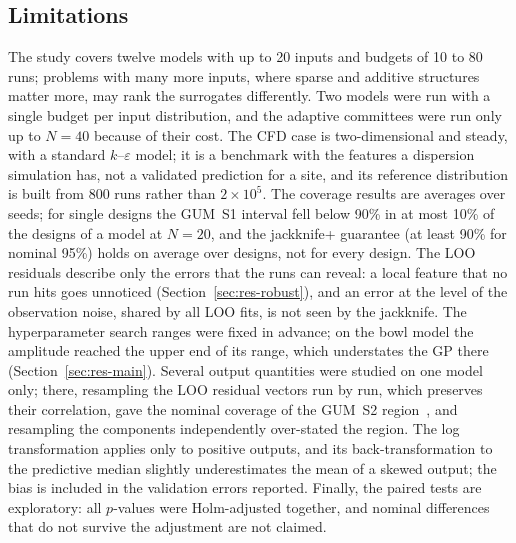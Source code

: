 \subsection{Limitations}
The study covers twelve models with up to 20 inputs and budgets of 10 to
80 runs; problems with many more inputs, where sparse and additive
structures matter more, may rank the surrogates differently. Two models were run with
a single budget per input distribution, and the adaptive committees were
run only up to $N=40$ because of their cost. The CFD case is
two-dimensional and steady, with a standard $k$--$\varepsilon$ model; it is a
benchmark with the features a dispersion simulation has, not a validated
prediction for a site, and its reference distribution is built from 800
runs rather than $2\times10^5$. The coverage results are averages over
seeds; for single designs the GUM~S1 interval fell below 90\% in at most
10\% of the designs of a model at $N=20$, and the jackknife+ guarantee (at
least 90\% for nominal 95\%) holds on average over designs, not for every
design. The LOO residuals describe only the errors that the runs can
reveal: a local feature that no run hits goes unnoticed
(Section~\ref{sec:res-robust}), and an error at the level of the
observation noise, shared by all LOO fits, is not seen by the jackknife.
The hyperparameter search ranges were fixed in advance; on the bowl
model the amplitude reached the upper end of its range, which understates
the GP there (Section~\ref{sec:res-main}). Several output quantities were
studied on one model only; there, resampling the LOO residual vectors run
by run, which preserves their correlation, gave the nominal coverage of the
GUM~S2 region~\cite{jcgm102}, and resampling the components independently
over-stated the region. The log transformation applies only to positive
outputs, and its back-transformation to the predictive median slightly
underestimates the mean of a skewed output; the bias is included in the
validation errors reported. Finally, the paired tests are exploratory: all
$p$-values were Holm-adjusted together, and nominal differences that do not
survive the adjustment are not claimed.

